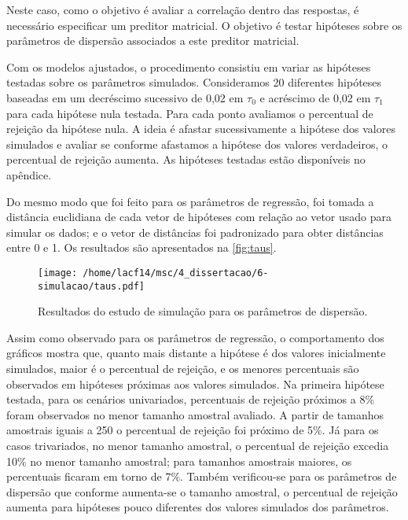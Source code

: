 Neste caso, como o objetivo é avaliar a correlação dentro das respostas, é necessário especificar um preditor matricial. O objetivo é testar hipóteses sobre os parâmetros de dispersão associados a este preditor matricial. 

Com os modelos ajustados, o procedimento consistiu em variar as hipóteses testadas sobre os parâmetros simulados. Consideramos 20 diferentes hipóteses baseadas em um decréscimo sucessivo de 0,02 em $\tau_0$ e acréscimo de 0,02 em $\tau_1$ para cada hipótese nula testada. Para cada ponto avaliamos o percentual de rejeição da hipótese nula. A ideia é afastar sucessivamente a hipótese dos valores simulados e avaliar se conforme afastamos a hipótese dos valores verdadeiros, o percentual de rejeição aumenta. As hipóteses testadas estão disponíveis no apêndice.

Do mesmo modo que foi feito para os parâmetros de regressão, foi tomada a distância euclidiana de cada vetor de hipóteses com relação ao vetor usado para simular os dados; e o vetor de distâncias foi padronizado para obter distâncias entre 0 e 1. Os resultados são apresentados na \autoref{fig:taus}.

\begin{figure}[H]
\centering
\texttt{[image: /home/lacf14/msc/4\_dissertacao/6-simulacao/taus.pdf]}
\caption{Resultados do estudo de simulação para os parâmetros de dispersão.}
\label{fig:taus}
\end{figure}

Assim como observado para os parâmetros de regressão, o comportamento dos gráficos mostra que, quanto mais distante a hipótese é dos valores inicialmente simulados, maior é o percentual de rejeição, e os menores percentuais são observados em hipóteses próximas aos valores simulados. Na primeira hipótese testada, para os cenários univariados, percentuais de rejeição próximos a 8\% foram observados no menor tamanho amostral avaliado. A partir de tamanhos amostrais iguais a 250 o percentual de rejeição foi próximo de 5\%. Já para os casos trivariados, no menor tamanho amostral, o percentual de rejeição excedia 10\% no menor tamanho amostral; para tamanhos amostrais maiores, os percentuais ficaram em torno de 7\%. Também verificou-se para os parâmetros de dispersão que conforme aumenta-se o tamanho amostral, o percentual de rejeição aumenta para hipóteses pouco diferentes dos valores simulados dos parâmetros.

